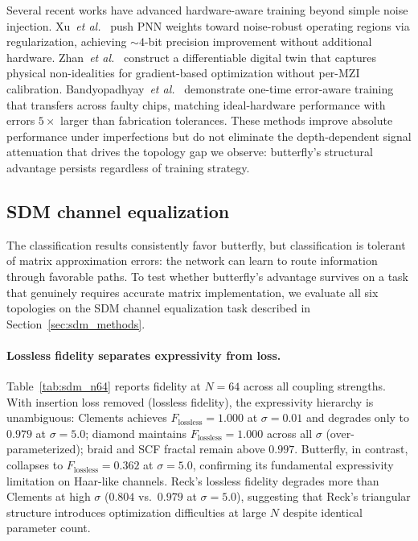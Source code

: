 \documentclass[11pt,a4paper]{article}
\begin{document}
Several recent works have advanced hardware-aware training beyond simple noise
injection.  Xu~\textit{et al.}~\cite{xu2024} push PNN weights toward
noise-robust operating regions via regularization, achieving ${\sim}4$-bit
precision improvement without additional hardware.
Zhan~\textit{et al.}~\cite{zhan2024} construct a differentiable digital twin
that captures physical non-idealities for gradient-based optimization without
per-MZI calibration.
Bandyopadhyay~\textit{et al.}~\cite{bandyopadhyay2023} demonstrate one-time
error-aware training that transfers across faulty chips, matching
ideal-hardware performance with errors $5\times$ larger than fabrication
tolerances.  These methods improve absolute performance under imperfections
but do not eliminate the depth-dependent signal attenuation that drives the
topology gap we observe: butterfly's structural advantage persists regardless
of training strategy.


\subsection{SDM channel equalization}
\label{sec:sdm_results}

The classification results consistently favor butterfly, but classification
is tolerant of matrix approximation errors: the network can learn to route
information through favorable paths.  To test whether butterfly's advantage
survives on a task that genuinely requires accurate matrix implementation, we
evaluate all six topologies on the SDM channel equalization task described in
Section~\ref{sec:sdm_methods}.

\paragraph{Lossless fidelity separates expressivity from loss.}
Table~\ref{tab:sdm_n64} reports fidelity at $N{=}64$ across all coupling
strengths.  With insertion loss removed (lossless fidelity), the
expressivity hierarchy is unambiguous: Clements achieves
$F_{\mathrm{lossless}} = 1.000$ at $\sigma = 0.01$ and degrades only to
$0.979$ at $\sigma = 5.0$; diamond maintains $F_{\mathrm{lossless}} = 1.000$
across all $\sigma$ (over-parameterized); braid and SCF fractal remain above
$0.997$.  Butterfly, in contrast, collapses to
$F_{\mathrm{lossless}} = 0.362$ at $\sigma = 5.0$, confirming its
fundamental expressivity limitation on Haar-like channels.  Reck's lossless
fidelity degrades more than Clements at high $\sigma$ ($0.804$ vs.\ $0.979$
at $\sigma = 5.0$), suggesting that Reck's triangular structure introduces
optimization difficulties at large $N$ despite identical parameter count.
\end{document}
